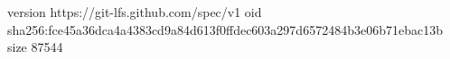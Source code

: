 version https://git-lfs.github.com/spec/v1
oid sha256:fce45a36dca4a4383cd9a84d613f0ffdec603a297d6572484b3e06b71ebac13b
size 87544
